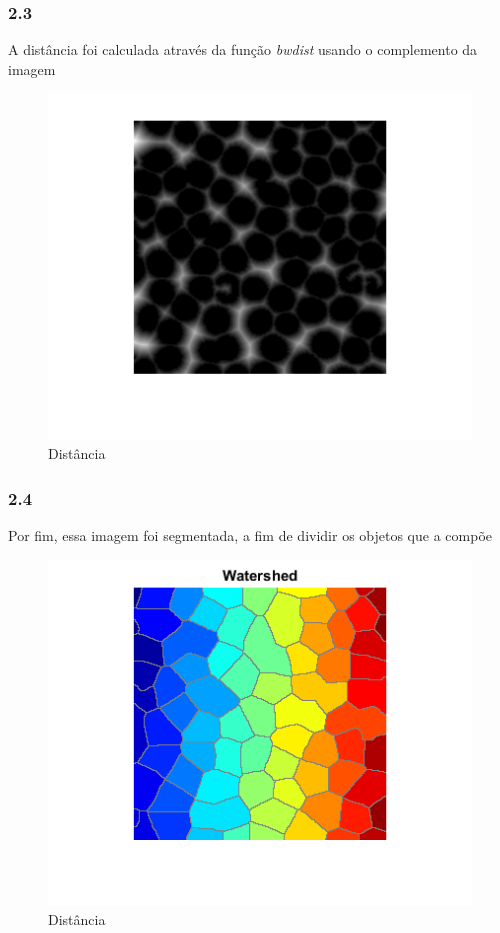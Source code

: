 \documentclass[journal]{IEEEtran}
\begin{document}
\subsubsection*{2.3}
A distância foi calculada através da função \textit{bwdist} usando o complemento da imagem

\begin{figure}[!htb]
	\centering
	\includegraphics[scale=0.5]{2distancia.png}
	\caption{Distância}
	\label{Original}
\end{figure}

\subsubsection*{2.4}
Por fim, essa imagem foi segmentada, a fim de dividir os objetos que a compõe\newline
\\ 

\begin{figure}[!htb]
	\centering
	\includegraphics[scale=0.5]{2-wathershed.png}
	\caption{Distância}
	\label{Original}
\end{figure}
\end{document}
